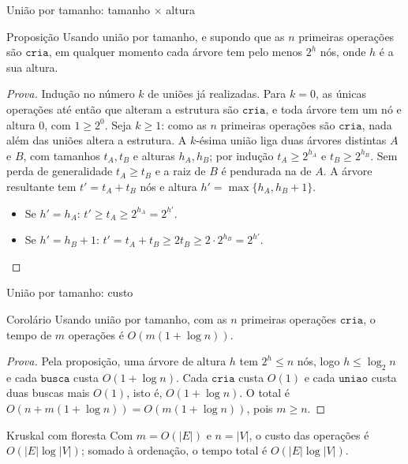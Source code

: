 \documentclass[aspectratio=169,10pt]{beamer}
\newcommand{\Cria}{\mathtt{cria}}
\newcommand{\Busca}{\mathtt{busca}}
\newcommand{\Uniao}{\mathtt{uniao}}
\begin{document}
\begin{frame}[t]{União por tamanho: tamanho $\times$ altura}

  \begin{block}{Proposição}
    Usando união por tamanho, e supondo que as $n$ primeiras operações
    são $\Cria$, em qualquer momento cada árvore tem pelo menos $2^h$
    nós, onde $h$ é a sua altura.
  \end{block}\pause
  \begin{proof}[Prova]
    \small
    Indução no número $k$ de uniões já realizadas.  Para $k=0$, as
    únicas operações até então que alteram a estrutura são $\Cria$, e
    toda árvore tem um nó e altura $0$, com $1\geq2^0$.  Seja $k\geq1$:
    como as $n$ primeiras operações são $\Cria$, nada além das uniões
    altera a estrutura.  A $k$-ésima união liga duas árvores distintas
    $A$ e $B$, com tamanhos $t_A,t_B$ e alturas $h_A,h_B$; por indução
    $t_A\geq2^{h_A}$ e $t_B\geq2^{h_B}$.  Sem perda de generalidade
    $t_A\geq t_B$ e a raiz de $B$ é pendurada na de $A$.  A árvore
    resultante tem $t'=t_A+t_B$ nós e altura $h'=\max\{h_A,h_B+1\}$.
    \begin{itemize}
    \item Se $h'=h_A$: $t'\geq t_A\geq2^{h_A}=2^{h'}$.
    \item Se $h'=h_B+1$: $t'=t_A+t_B\geq2t_B\geq2\cdot2^{h_B}=2^{h'}$.
    \end{itemize}
  \end{proof}
\end{frame}

\begin{frame}[t]{União por tamanho: custo}
  \begin{block}{Corolário}
    Usando união por tamanho, com as $n$ primeiras operações $\Cria$, o
    tempo de $m$ operações é $O(m(1+\log n))$.
  \end{block}
  \begin{proof}[Prova]
    Pela proposição, uma árvore de altura $h$ tem $2^h\leq n$ nós, logo
    $h\leq\log_2n$ e cada $\Busca$ custa $O(1+\log n)$.  Cada $\Cria$
    custa $O(1)$ e cada $\Uniao$ custa duas buscas mais $O(1)$, isto é,
    $O(1+\log n)$.  O total é $O(n+m(1+\log n))=O(m(1+\log n))$, pois
    $m\geq n$.
  \end{proof}
  \begin{alertblock}{Kruskal com floresta}
    Com $m=O(|E|)$ e $n=|V|$, o custo das operações é
    $O(|E|\log|V|)$; somado à ordenação, o tempo total é
    $O(|E|\log|V|)$.
  \end{alertblock}
\end{frame}
\end{document}
